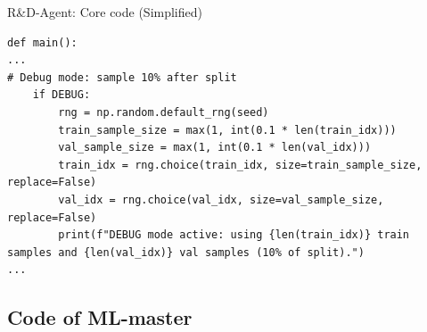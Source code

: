 \begin{codebox}{R\&D-Agent: Core code (Simplified)}
\begin{verbatim}
def main():
...
# Debug mode: sample 10% after split
    if DEBUG:
        rng = np.random.default_rng(seed)
        train_sample_size = max(1, int(0.1 * len(train_idx)))
        val_sample_size = max(1, int(0.1 * len(val_idx)))
        train_idx = rng.choice(train_idx, size=train_sample_size, replace=False)
        val_idx = rng.choice(val_idx, size=val_sample_size, replace=False)
        print(f"DEBUG mode active: using {len(train_idx)} train samples and {len(val_idx)} val samples (10% of split).")
...
\end{verbatim}
\end{codebox}


\subsection{Code of ML-master}

